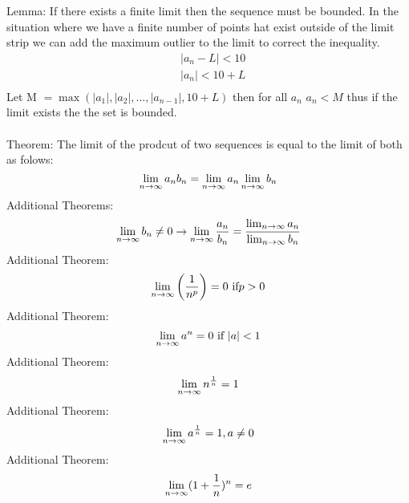 \documentclass[11pt]{article}
\theoremstyle{definition}  %
\begin{document}
Lemma: If there exists a finite limit then the sequence must be bounded. In the situation where we have a finite number of points hat exist outside of the limit strip we can add the maximum outlier to the limit to correct the inequality. \\
\begin{align*}
  &|a_n-L|<10\\
  &|a_n|<10+L\\
\end{align*}
Let M $=\max(|a_1|,|a_2|,...,|a_{n-1}|,10+L)$ then for all $a_n $ $a_n<M $ thus if the limit exists the the set is bounded.\\\\
Theorem: The limit of the prodcut of two sequences is equal to the limit of both as folows:
\[
  \lim_{n\rightarrow\infty} a_nb_n=\lim_{n\rightarrow\infty} a_n\lim_{n\rightarrow\infty} b_n
\]
Additional Theorems:
\[
  \lim_{n\rightarrow\infty} b_n \neq 0 \rightarrow \lim_{n\rightarrow\infty} \frac{a_n}{b_n}=\frac{\lim_{n\rightarrow\infty} a_n}{\lim_{n\rightarrow\infty} b_n}
\]
Additional Theorem:
\[
  \lim_{n\rightarrow\infty} \left(\frac{1}{n^p}\right)=0 \text{ if}  p>0
\]
Additional Theorem:
\[
  \lim_{n\rightarrow\infty} a^n=0 \text{ if } |a|<1
\]
Additional Theorem:
\[
  \lim_{n\rightarrow\infty} n^{\frac{1}{n}}=1
\]
Additional Theorem:
\[
  \lim_{n\rightarrow\infty} a^{\frac{1}{n}}=1, a\neq 0
\]
Additional Theorem: 
\[
  \lim_{n\rightarrow\infty}( 1+\frac{1}{n})^n =e
\]
\end{document}
